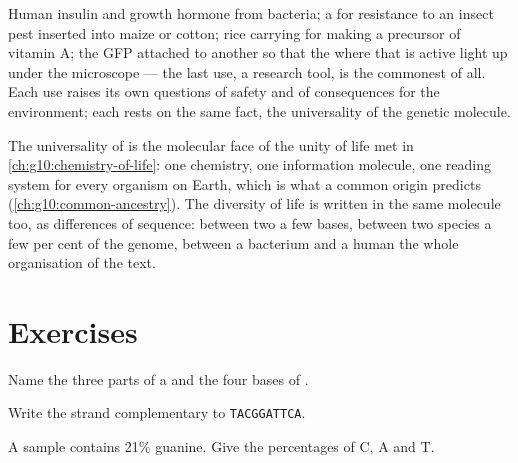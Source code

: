\begin{example}\label{ex:g10:universal-dna:uses}
Human insulin and growth hormone from bacteria; a  for resistance
to an insect pest inserted into maize or cotton; rice carrying 
for making a precursor of vitamin A; the GFP  attached to another
 so that the  where that  is active light up under the
microscope --- the last use, a research tool, is the commonest of all.
Each use raises its own questions of safety and of consequences for
the environment; each rests on the same fact, the universality of the
genetic molecule.
\end{example}

\begin{remark}\label{rem:g10:universal-dna:unity}
The universality of  is the molecular face of the unity of life met
in \cref{ch:g10:chemistry-of-life}: one chemistry, one information
molecule, one reading system for every organism on Earth, which is
what a common origin predicts (\cref{ch:g10:common-ancestry}). The
diversity of life is written in the same molecule too, as differences
of sequence: between two  a few bases, between two species a
few per cent of the genome, between a bacterium and a human the whole
organisation of the text.
\end{remark}

\section{Exercises}

\begin{exercise}[$\star$]\label{exo:g10:universal-dna:1}
Name the three parts of a  and the four bases of .
\end{exercise}

\begin{exercise}[$\star$]\label{exo:g10:universal-dna:2}
Write the strand complementary to \texttt{TACGGATTCA}.
\end{exercise}

\begin{exercise}[$\star$]\label{exo:g10:universal-dna:3}
A  sample contains 21\% guanine. Give the percentages of C, A and
T.
\end{exercise}

